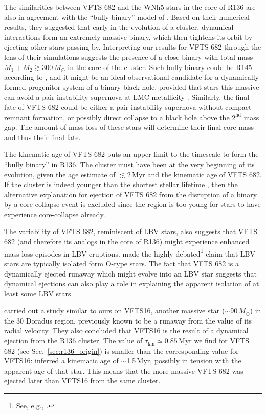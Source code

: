 \documentclass[apjl,twocolumn]{emulateapj}
\DeclareRobustCommand{\Secref}[1]{Sec.~\ref{#1}}
\begin{document}
The similarities between VFTS 682 and the WNh5 stars in the core of
R136 are also in agreement with the ``bully binary'' model of
\cite{fujii:11}. Based on their numerical results, they suggested that
early in the evolution of a cluster, dynamical interactions form an extremely
massive binary, which then tightens its orbit by ejecting other stars passing
by. Interpreting our results for VFTS 682 through the lens of their simulations
suggests the presence of a close binary with total mass
$M_1+M_2\gtrsim 300\,M_\odot$ in the core of the cluster. Such bully
binary could be R145 according to \cite{fujii:11}, and it might be an
ideal observational candidate for a dynamically formed progenitor system of
a binary black-hole, provided that stars this massive can avoid a
pair-instability supernova \cite[][]{fowler:64, rakavy:67} at LMC
metallicity \citep[see also][]{langer:07}. Similarly, the final fate of VFTS 682 could be either a
pair-instability supernova without compact remnant formation, or
possibly direct collapse to a black hole above the $2^\mathrm{nd}$
mass gap. The amount of mass loss of these stars will determine their final core
mass and thus their final fate.

The kinematic age of VFTS 682 puts an
upper limit to the timescale to form the ``bully binary'' in
R136. The cluster must have been at the very beginning of its
evolution, given the age estimate of $\lesssim 2$\,Myr
\citep[][]{crowther:10,sabbi:12} and the kinematic age of VFTS 682. If the
cluster is indeed younger than the shortest stellar lifetime
\citep[$\sim$3\,Myr, e.g.,][]{zapartas:17}, then the alternative
explanation for ejection of VFTS 682 from the disruption of a binary
by a core-collapse event is excluded since the region is too young for stars
to have experience core-collapse already.
 
The variability of VFTS 682, reminiscent of LBV stars, also suggests
that VFTS 682 (and therefore its analogs in the core of R136) might
experience enhanced mass loss episodes in LBV eruptions. \citet{smith:15} made the highly
debated\footnote{See, e.g., \cite{humphreys:16, davidson:16, smith:16}.}
claim that LBV stars are typically isolated form O-type stars. The fact that VFTS 682 is a dynamically
ejected runaway which might evolve into an LBV star suggests that
dynamical ejections can also play a role in explaining the apparent
isolation of at least some LBV stars. 

\citet{lennon:18} carried out a study similar to ours on VFTS16, another
massive star ($\sim$$90\,M_\odot$) in the 30 Doradus region, previously
known to be a runaway from the value of
its radial velocity. They also concluded that VFTS16 is 
the result of a dynamical ejection from the R136 cluster. 
The value of $\tau_\mathrm{kin}\simeq0.85$\,Myr we find for VFTS 682 (see \Secref{sec:r136_origin}) is smaller
than the corresponding value for VFTS16: \cite{lennon:18} inferred a kinematic age of
$\sim$1.5\,Myr, possibly in tension with the apparent age of that star. This means that the more
massive VFTS 682 was ejected later than VFTS16 from the same cluster.
\end{document}
